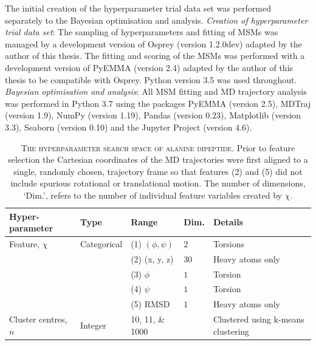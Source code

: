 The initial creation of the hyperparameter trial data set was performed separately to the Bayesian optimisation and analysis. \emph{Creation of hyperparameter trial data set}: The sampling of hyperparameters and fitting of MSMs was managed by a development version of Osprey (version 1.2.0dev)\cite{mcgibbonOspreyHyperparameterOptimization2016} adapted by the author of this thesis. The fitting and scoring of the MSMs was performed with a development version of PyEMMA (version 2.4) \cite{schererPyEMMASoftwarePackage2015a} adapted by the author of this thesis to be compatible with Osprey. Python version 3.5 was used throughout. \emph{Bayesian optimisation and analysis}:
All MSM fitting and MD trajectory analysis was performed in Python 3.7 using the packages PyEMMA (version 2.5)\cite{schererPyEMMASoftwarePackage2015a}, MDTraj (version 1.9)\cite{mcgibbonMDTrajModernOpen2015}, NumPy (version 1.19)\cite{waltNumPyArrayStructure2011}, Pandas (version 0.23)\cite{mckinneyPandasFoundationalPython2011}, Matplotlib (version 3.3)\cite{hunterMatplotlib2DGraphics2007},  Seaborn (version 0.10)\cite{michaelwaskomMwaskomSeabornV02020} and the Jupyter Project (version 4.6)\cite{kluyverJupyterNotebooksPublishing2016}.

\begin{table}
    \caption[The hyperparameter search space of alanine dipeptide]{\textsc{The hyperparameter search space of alanine dipeptide}. Prior to feature selection the Cartesian coordinates of the MD trajectories were first aligned to a single, randomly chosen, trajectory frame so that features (2) and (5) did not include spurious rotational or translational motion.  The number of dimensions, `Dim.', refers to the number of individual feature variables created by $\chi$.}
    \centering
    \begin{tabularx}{0.9\textwidth}{ >{\raggedright\arraybackslash}X lll >{\raggedright\arraybackslash}X } 
    \hline
    \textbf{Hyper-parameter} & \textbf{Type} & \textbf{Range} &\textbf{Dim.} & \textbf{Details} \\
     \hline\hline
    Feature, $\chi$ & Categorical & (1) $(\phi, \psi)$ & $2$ & Torsions \\
    & & (2) (x, y, z) & $30$ & Heavy atoms only  \\
    & & (3) $\phi$ & $1$ & Torsion \\ 
    & & (4) $\psi$ & $1$ & Torsion \\ 
    & & (5) RMSD & $1$ & Heavy atoms only\\ 
    \hline 
    Cluster centres, $n$ & Integer & \numlist[list-final-separator = { ... }]{10;11;1000} & & Clustered using k-means clustering \\
     \hline
    \end{tabularx}
    \label{tab:ala2searchspace}
\end{table}

